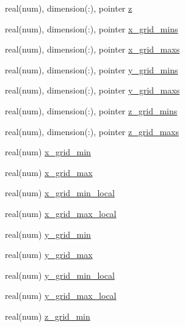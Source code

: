 \begin{DoxyCompactItemize}
\item 
real(num), dimension(\+:), pointer \hyperlink{namespaceshared__data_a2094b23a08f2ff99add0a52c71d13b04}{z}
\item 
real(num), dimension(\+:), pointer \hyperlink{namespaceshared__data_ab595b2b077b3dd6067602742e089c333}{x\+\_\+grid\+\_\+mins}
\item 
real(num), dimension(\+:), pointer \hyperlink{namespaceshared__data_a486820ed6ed463bc8084e37890eb105e}{x\+\_\+grid\+\_\+maxs}
\item 
real(num), dimension(\+:), pointer \hyperlink{namespaceshared__data_a54dff3f43983b04af43c4eb2d91dea38}{y\+\_\+grid\+\_\+mins}
\item 
real(num), dimension(\+:), pointer \hyperlink{namespaceshared__data_ad3b97b7b23eb4f1708bf6934787c3bc9}{y\+\_\+grid\+\_\+maxs}
\item 
real(num), dimension(\+:), pointer \hyperlink{namespaceshared__data_a7888fecc3fc8288475a70c8cec55313e}{z\+\_\+grid\+\_\+mins}
\item 
real(num), dimension(\+:), pointer \hyperlink{namespaceshared__data_a0e3e23f798e7e32d6ae0684ffa41a089}{z\+\_\+grid\+\_\+maxs}
\item 
real(num) \hyperlink{namespaceshared__data_a76d3dbdf07d1cb5aed88b436a613a6f6}{x\+\_\+grid\+\_\+min}
\item 
real(num) \hyperlink{namespaceshared__data_a109ff2adf267448d4110d7618c16ae54}{x\+\_\+grid\+\_\+max}
\item 
real(num) \hyperlink{namespaceshared__data_a12ab3a40a19df149a5d322939704a393}{x\+\_\+grid\+\_\+min\+\_\+local}
\item 
real(num) \hyperlink{namespaceshared__data_ad2be7fb0274c89536c91025c7db88b50}{x\+\_\+grid\+\_\+max\+\_\+local}
\item 
real(num) \hyperlink{namespaceshared__data_a427f8d5d09444c1a0e5a4cfac1821143}{y\+\_\+grid\+\_\+min}
\item 
real(num) \hyperlink{namespaceshared__data_a37d0ccaa88ff8097e3e496c1499acb9b}{y\+\_\+grid\+\_\+max}
\item 
real(num) \hyperlink{namespaceshared__data_ae639d9c6de4b202530ffc9c74cfaf75b}{y\+\_\+grid\+\_\+min\+\_\+local}
\item 
real(num) \hyperlink{namespaceshared__data_a2690e59dee9f1fae66f0a6d9abf19b88}{y\+\_\+grid\+\_\+max\+\_\+local}
\item 
real(num) \hyperlink{namespaceshared__data_a16d11c0437372fc94fba8f696cc3435d}{z\+\_\+grid\+\_\+min}
\item 

\end{DoxyCompactItemize}
